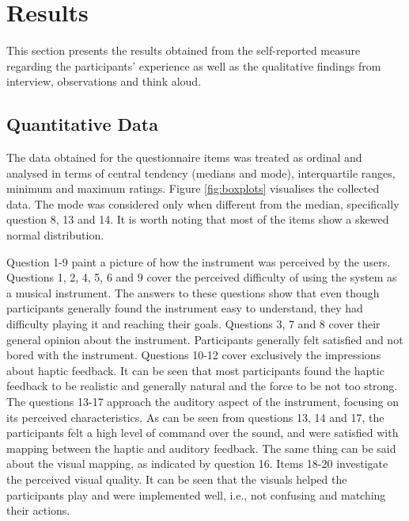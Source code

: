 \documentclass[dvipsnames, pdftex]{article}
\begin{document}
\section{Results}\label{sec:results}
This section presents the results obtained from the self-reported measure regarding the participants' experience as well as the qualitative findings from interview, observations and think aloud.

\subsection{Quantitative Data}
The data obtained for the questionnaire items was treated as ordinal and analysed in terms of central tendency (medians and mode), interquartile ranges, minimum and maximum ratings. Figure \ref{fig:boxplots} visualises the collected data. The mode was considered only when different from the median, specifically question 8, 13 and 14. It is worth noting that most of the items show a skewed normal distribution.

Question 1-9 paint a picture of how the instrument was perceived by the users. Questions 1, 2, 4, 5, 6 and 9 cover the perceived difficulty of using the system as a musical instrument. The answers to these questions show that even though participants generally found the instrument easy to understand, they had difficulty playing it and reaching their goals.
Questions 3, 7 and 8 cover their general opinion about the instrument. Participants generally felt satisfied and not bored with the instrument.
Questions 10-12 cover exclusively the impressions about haptic feedback. It can be seen that most participants found the haptic feedback to be realistic and generally natural and the force to be not too strong.
The questions 13-17 approach the auditory aspect of the instrument, focusing on its perceived characteristics. As can be seen from questions 13, 14 and 17, the participants felt a high level of command over the sound, and were satisfied with mapping between the haptic and auditory feedback. The same thing can be said about the visual mapping, as indicated by question 16. 
Items 18-20 investigate the perceived visual quality. It can be seen that the visuals helped the participants play and were implemented well, i.e., not confusing and matching their actions.
\end{document}
